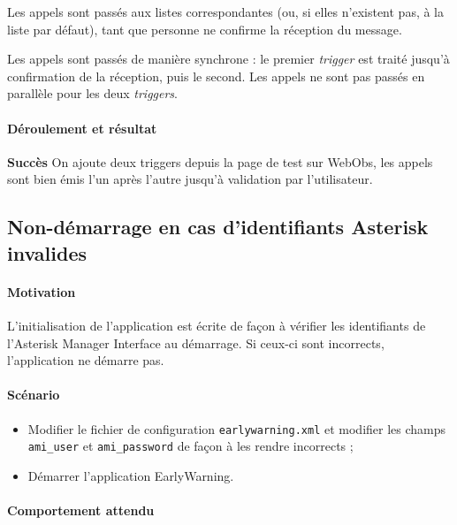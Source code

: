 \documentclass{article}
\begin{document}
Les appels sont passés aux listes correspondantes (ou, si elles n'existent pas, à la liste par défaut), tant que personne ne confirme la réception du message.

Les appels sont passés de manière synchrone : le premier \emph{trigger} est traité jusqu'à confirmation de la réception, puis le second. Les appels ne sont pas passés en parallèle pour les deux \emph{triggers}.

\paragraph{Déroulement et résultat\\} 

\textbf{Succès} On ajoute deux triggers depuis la page de test sur WebObs, les appels sont bien émis l'un après l'autre jusqu'à validation par l'utilisateur.

\subsection{Non-démarrage en cas d'identifiants Asterisk invalides}

\paragraph{Motivation\\}

L'initialisation de l'application est écrite de façon à vérifier les identifiants de l'Asterisk Manager Interface au démarrage. Si ceux-ci sont incorrects, l'application ne démarre pas.

\paragraph{Scénario\\}

\begin{itemize}
    \item Modifier le fichier de configuration \texttt{earlywarning.xml} et modifier les champs \texttt{ami\_user} et \texttt{ami\_password} de façon à les rendre incorrects ;
    \item Démarrer l'application EarlyWarning.
\end{itemize}

\paragraph{Comportement attendu\\}
\end{document}
